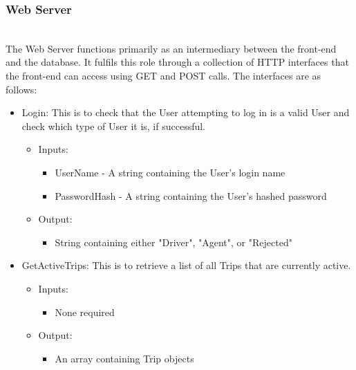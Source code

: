 \documentclass[10pt, onecolumn]{witseiepaper}
\begin{document}
\subsubsection{Web Server}\mbox{}\\
The Web Server functions primarily as an intermediary between the front-end and the database. It fulfils this role through a collection of HTTP interfaces that the front-end can access using GET and POST calls. The interfaces are as follows:
\begin{itemize}
\item Login: This is to check that the User attempting to log in is a valid User and check which type of User it is, if successful.
	\begin{itemize}
	\item Inputs:
		\begin{itemize}
		\item UserName - A string containing the User's login name
		\item PasswordHash - A string containing the User's hashed password
		\end{itemize}
	\item Output:
		\begin{itemize}
		\item String containing either "Driver", "Agent", or "Rejected" 
		\end{itemize}
	\end{itemize}
\item GetActiveTrips: This is to retrieve a list of all Trips that are currently active.
	\begin{itemize}
	\item Inputs:
		\begin{itemize}
		\item None required
		\end{itemize}
	\item Output:
		\begin{itemize}
		\item An array containing Trip objects
		\end{itemize}
	\end{itemize}
	

\end{itemize}
\end{document}
